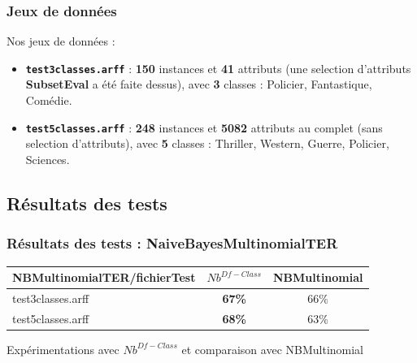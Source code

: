 \documentclass[12pt]{beamer}
\begin{document}
\begin{frame}
\frametitle{Jeux de données}

Nos jeux de données : 
\begin{itemize}
\item \texttt{\textbf{test3classes.arff}} : \textbf{150} instances et \textbf{41} attributs (une selection d'attributs \textbf{SubsetEval} a été faite dessus), avec \textbf{3} classes : Policier, Fantastique, Comédie.
\item \texttt{\textbf{test5classes.arff}} : \textbf{248} instances et \textbf{5082} attributs au complet (sans selection d'attributs), avec \textbf{5} classes : Thriller, Western, Guerre, Policier, Sciences.
\end{itemize}


\end{frame}




\subsection{Résultats des tests}
\begin{frame}
\frametitle{Résultats des tests : NaiveBayesMultinomialTER}


\begin{table}
\centering
    \begin{tabular}{|l|c||c|}
    \hline
    NBMultinomialTER/fichierTest  & $Nb^{Df-Class}$ & NBMultinomial \\ \hline
    test3classes.arff & \textbf{67\%}   & 66\%  \\ \hline
    test5classes.arff & \textbf{68\%} & 63\%  \\ \hline
    \end{tabular}
\end{table}
\medskip
Expérimentations avec $Nb^{Df-Class}$ et comparaison avec NBMultinomial
\end{frame}
\end{document}
